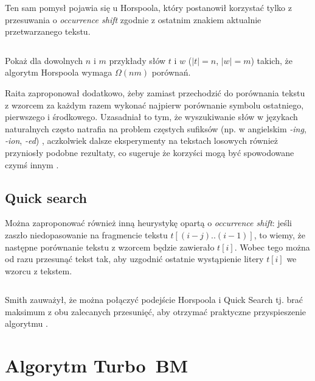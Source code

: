 Ten sam pomysł pojawia się u Horspoola, który postanowił korzystać tylko z przesuwania o \emph{occurrence shift} zgodnie z ostatnim znakiem aktualnie przetwarzanego tekstu.

\begin{code}
\inputminted{python}{code/exact-string-matching/horspool.py}
\label{alg:exact-string-matching-horspool}
\end{code}

\begin{problem}{}{}
  Pokaż dla dowolnych $n$ i $m$ przykłady słów $t$ i $w$ ($|t| = n$, $|w| = m$) takich, że algorytm Horspoola wymaga $\Omega(n m)$ porównań.
\end{problem}

Raita zaproponował dodatkowo, żeby zamiast przechodzić do porównania tekstu z wzorcem za każdym razem wykonać najpierw porównanie symbolu ostatniego, pierwszego i środkowego.
Uzasadniał to tym, że wyszukiwanie słów w językach naturalnych często natrafia na problem częstych sufiksów (np. w angielskim \emph{-ing}, \emph{-ion}, \emph{-ed}) \cite{raita1992tuning}, aczkolwiek dalsze eksperymenty na tekstach losowych również przyniosły podobne rezultaty, co sugeruje że korzyści mogą być spowodowane czymś innym \cite{smith1994tuning}.

\subsection{Quick search}

Można zaproponować również inną heurystykę opartą o \emph{occurrence shift}: jeśli zaszło niedopasowanie na fragmencie tekstu $t[(i - j)..(i - 1)]$, to wiemy, że następne porównanie tekstu z wzorcem będzie zawierało $t[i]$. Wobec tego można od razu przesunąć tekst tak, aby uzgodnić ostatnie wystąpienie litery $t[i]$ we wzorcu z tekstem.

\begin{code}
\inputminted{python}{code/exact-string-matching/quick-search.py}
\label{alg:exact-string-matching-quick-search}
\end{code}

Smith zauważył, że można połączyć podejście Horspoola i Quick Search tj. brać maksimum z obu zalecanych przesunięć, aby otrzymać praktyczne przyspieszenie algorytmu \cite{smith1991experiments}.

\section{Algorytm Turbo~BM}

